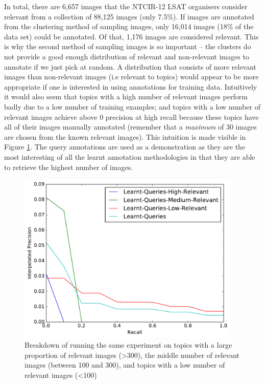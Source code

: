 In total, there are 6,657 images that the NTCIR-12 LSAT organisers consider relevant from a collection of 88,125 images (only 7.5\%). If images are annotated from the clustering method of sampling images, only 16,014 images (18\% of the data set) could be annotated. Of that, 1,176 images are considered relevant. This is why the second method of sampling images is so important -- the clusters do not provide a good enough distribution of relevant and non-relevant images to annotate if we just pick at random. A distribution that consists of more relevant images than non-relevant images (i.e relevant to topics) would appear to be more appropriate if one is interested in using annotations for training data. Intuitively it would also seem that topics with a high number of relevant images perform badly due to a low number of training examples; and topics with a low number of relevant images achieve above $0$ precision at high recall because these topics have all of their images manually annotated (remember that a \textit{maximum} of $30$ images are chosen from the known relevant images). This intuition is made visible in Figure \ref{fig:learnt-queries}. The query annotations are used as a demonstration as they are the most interesting of all the learnt annotation methodologies in that they are able to retrieve the highest number of images.

\begin{figure}[h]
    \centering
    \includegraphics[width=0.95\textwidth]{graphs/learnt-queries}
    \caption{Breakdown of running the same experiment on topics with a large proportion of relevant images (\textgreater 300), the middle number of relevant images (between 100 and 300), and topics with a low number of relevant images (\textless 100)}
    \label{fig:learnt-queries}
\end{figure}

